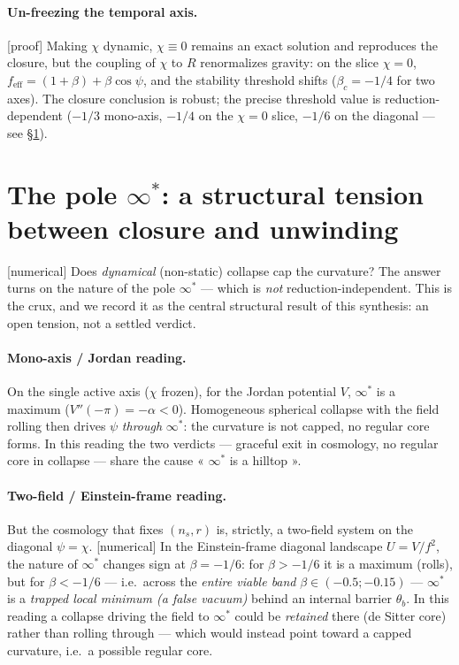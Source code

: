 \documentclass[11pt,a4paper]{article}
\newcommand{\statut}[1]{{\footnotesize\textsf{[#1]}}}
\theoremstyle{definition}
\begin{document}
\paragraph{Un-freezing the temporal axis.} \statut{proof} Making $\chi$ dynamic,
$\chi\equiv0$ remains an exact solution and reproduces the closure, but the coupling of $\chi$
to $R$ renormalizes gravity: on the slice $\chi=0$, $f_{\mathrm{eff}}=(1+\beta)+\beta\cos\psi$,
and the stability threshold shifts ($\beta_c=-1/4$ for two axes). The closure conclusion is
robust; the precise threshold value is reduction-dependent ($-1/3$ mono-axis, $-1/4$ on the
$\chi=0$ slice, $-1/6$ on the diagonal --- see \S\ref{sec:collapse}).

\section{The pole $\infty^*$: a structural tension between closure and unwinding}\label{sec:collapse}
\statut{numerical} Does \emph{dynamical} (non-static) collapse cap the curvature? The answer
turns on the nature of the pole $\infty^*$ --- which is \emph{not} reduction-independent. This
is the crux, and we record it as the central structural result of this synthesis: an open
tension, not a settled verdict.

\paragraph{Mono-axis / Jordan reading.} On the single active axis ($\chi$ frozen), for the
Jordan potential $V$, $\infty^*$ is a maximum ($V''(-\pi)=-\alpha<0$). Homogeneous spherical
collapse with the field rolling then drives $\psi$ \emph{through} $\infty^*$: the curvature is
not capped, no regular core forms. In this reading the two verdicts --- graceful exit in
cosmology, no regular core in collapse --- share the cause « $\infty^*$ is a hilltop ».

\paragraph{Two-field / Einstein-frame reading.} But the cosmology that fixes $(n_s,r)$ is,
strictly, a two-field system on the diagonal $\psi=\chi$. \statut{numerical} In the
Einstein-frame diagonal landscape $U=V/f^2$, the nature of $\infty^*$ changes sign at
$\beta=-1/6$: for $\beta>-1/6$ it is a maximum (rolls), but for $\beta<-1/6$ --- i.e.\ across
the \emph{entire viable band} $\beta\in(-0.5;-0.15)$ --- $\infty^*$ is a \emph{trapped local
minimum (a false vacuum)} behind an internal barrier $\theta_b$. In this reading a collapse
driving the field to $\infty^*$ could be \emph{retained} there (de Sitter core) rather than
rolling through --- which would instead point toward a capped curvature, i.e.\ a possible
regular core.
\end{document}
